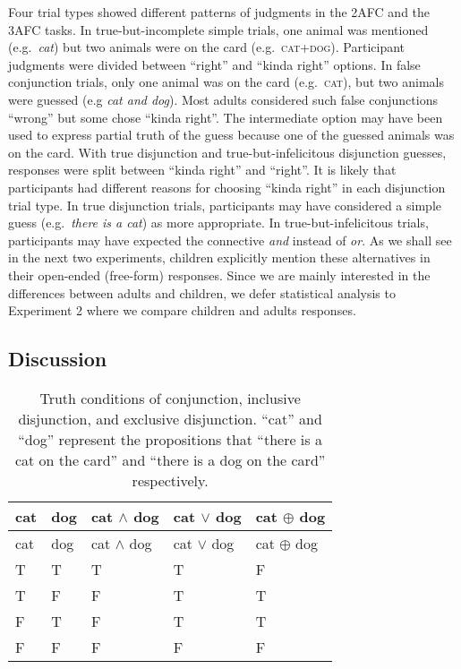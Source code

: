 \documentclass[
  english,
  ,man,floatsintext]{apa6}
\begin{document}
Four trial types showed different patterns of judgments in the 2AFC and the 3AFC tasks. In true-but-incomplete simple trials, one animal was mentioned (e.g.~\emph{cat}) but two animals were on the card (e.g.~\textsc{cat+dog}). Participant judgments were divided between \enquote{right} and \enquote{kinda right} options. In false conjunction trials, only one animal was on the card (e.g.~\textsc{cat}), but two animals were guessed (e.g \emph{cat and dog}). Most adults considered such false conjunctions \enquote{wrong} but some chose \enquote{kinda right}. The intermediate option may have been used to express partial truth of the guess because one of the guessed animals was on the card. With true disjunction and true-but-infelicitous disjunction guesses, responses were split between \enquote{kinda right} and \enquote{right}. It is likely that participants had different reasons for choosing \enquote{kinda right} in each disjunction trial type. In true disjunction trials, participants may have considered a simple guess (e.g.~\emph{there is a cat}) as more appropriate. In true-but-infelicitous trials, participants may have expected the connective \emph{and} instead of \emph{or}. As we shall see in the next two experiments, children explicitly mention these alternatives in their open-ended (free-form) responses. Since we are mainly interested in the differences between adults and children, we defer statistical analysis to Experiment 2 where we compare children and adults responses.

\hypertarget{discussion}{%
\subsection{Discussion}\label{discussion}}

\begin{longtable}[]{@{}lllll@{}}
\caption{\label{tab:truthtable} Truth conditions of conjunction, inclusive disjunction, and exclusive disjunction. \enquote{cat} and \enquote{dog} represent the propositions that \enquote{there is a cat on the card} and \enquote{there is a dog on the card} respectively.}\tabularnewline
\toprule
cat & dog & cat \(\land\) dog & cat \(\lor\) dog & cat \(\oplus\) dog\tabularnewline
\midrule
\endfirsthead
\toprule
cat & dog & cat \(\land\) dog & cat \(\lor\) dog & cat \(\oplus\) dog\tabularnewline
\midrule
\endhead
T & T & T & T & F\tabularnewline
T & F & F & T & T\tabularnewline
F & T & F & T & T\tabularnewline
F & F & F & F & F\tabularnewline
\bottomrule
\end{longtable}
\end{document}
